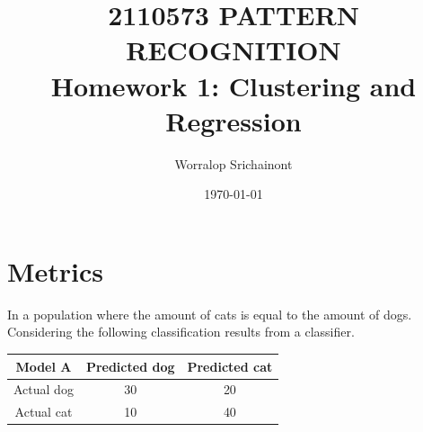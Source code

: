 \documentclass[12pt, a4paper]{article}
\title {
	\textbf{2110573 PATTERN RECOGNITION} \\
	\large{\textbf{Homework 1: Clustering and Regression}}
}
\author{Worralop Srichainont}
\date{\today}
\begin{document}
    \maketitle

    \section*{Metrics}

    In a population where the amount of cats is equal to the amount of dogs. Considering the following classification results from a classifier.

    \begin{table}[h]
        \centering
        \begin{tabular}{|c|c|c|}
            \hline
            Model A & Predicted dog & Predicted cat \\
            \hline \hline
            Actual dog & 30 & 20 \\
            \hline
            Actual cat & 10 & 40 \\
            \hline \hline
        \end{tabular}
    \end{table}
\end{document}
